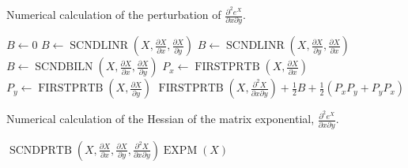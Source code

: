 \begin{algorithm}[!ht]
	\caption[Perturbation of $\frac{\partial^2 e^X}{\partial x \partial y}$]{Numerical calculation of the perturbation of $\frac{\partial^2 e^X}{\partial x \partial y}$.}
	\label{alg:second}
	\begin{algorithmic}[1]
				\State $B \gets 0$
				\State $B \gets \operatorname{SCNDLINR}\left(X, \frac{\partial X}{\partial x}, \frac{\partial X}{\partial y}\right)$
				\State $B \gets \operatorname{SCNDLINR}\left(X, \frac{\partial X}{\partial y}, \frac{\partial X}{\partial x}\right)$
			\Else
				\State $B \gets \operatorname{SCNDBILN}\left(X, \frac{\partial X}{\partial x}, \frac{\partial X}{\partial y}\right)$
			\EndIf
			\State $P_x \gets \operatorname{FIRSTPRTB}\left(X,\frac{\partial X}{\partial x}\right)$
			\State $P_y \gets \operatorname{FIRSTPRTB}\left(X,\frac{\partial X}{\partial y}\right)$
			\State \Return $\operatorname{FIRSTPRTB}\left(X,\frac{\partial^2 X}{\partial x \partial y}\right) + \frac{1}{2} B +  \frac{1}{2}\left(P_x P_y + P_y P_x\right)$
		\EndFunction
	\end{algorithmic}
\end{algorithm}
\begin{algorithm}[!ht]
	\caption[Hessian of $e^X$]{Numerical calculation of the Hessian of the matrix exponential, $\frac{\partial^2 e^X}{\partial x \partial y}$.}
	\label{alg:hessian}
	\begin{algorithmic}[1]
			\State \Return $\operatorname{SCNDPRTB}\left(X, \frac{\partial X}{\partial x}, \frac{\partial X}{\partial y}, \frac{\partial^2 X}{\partial x \partial y}\right) \operatorname{EXPM}\left(X\right)$
		\EndFunction
	\end{algorithmic}
\end{algorithm}